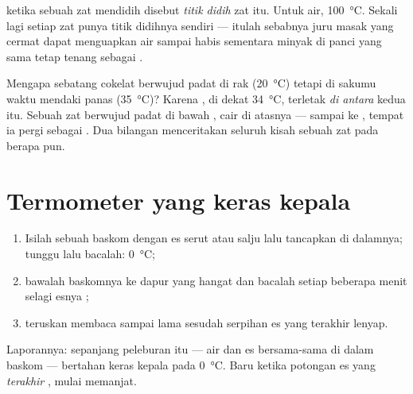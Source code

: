 \begin{definition}\label{def:g4:changes-of-state:boiling-point}
 ketika sebuah zat mendidih disebut
\emph{titik didih} zat itu. Untuk air, 
\qty{100}{\celsius}. Sekali lagi setiap zat punya titik didihnya
sendiri --- itulah sebabnya juru masak yang cermat dapat menguapkan
air sampai habis sementara minyak di panci yang sama tetap tenang
sebagai .
\end{definition}

\begin{example}\label{ex:g4:changes-of-state:reading}
Mengapa sebatang cokelat berwujud padat di rak (\qty{20}{\celsius})
tetapi  di sakumu waktu mendaki  panas
(\qty{35}{\celsius})? Karena , di dekat
\qty{34}{\celsius}, terletak \emph{di antara} kedua  itu. Sebuah
zat berwujud padat di bawah , cair di atasnya --- sampai
ke , tempat ia pergi sebagai . Dua bilangan
menceritakan seluruh kisah sebuah zat pada  berapa pun.
\end{example}

\section{Termometer yang keras kepala}

\begin{method}\label{met:g4:changes-of-state:watch}
\begin{enumerate}
  \item Isilah sebuah baskom dengan es serut atau salju lalu
        tancapkan  di dalamnya; tunggu lalu bacalah:
        \qty{0}{\celsius};
  \item bawalah baskomnya ke dapur yang hangat dan bacalah
         setiap beberapa menit selagi esnya ;
  \item teruskan membaca sampai lama sesudah serpihan es yang
        terakhir lenyap.
\end{enumerate}
Laporannya: sepanjang peleburan itu --- air dan es bersama-sama di
dalam baskom ---  bertahan keras kepala pada
\qty{0}{\celsius}. Baru ketika potongan es yang \emph{terakhir}
,  mulai memanjat.
\end{method}

